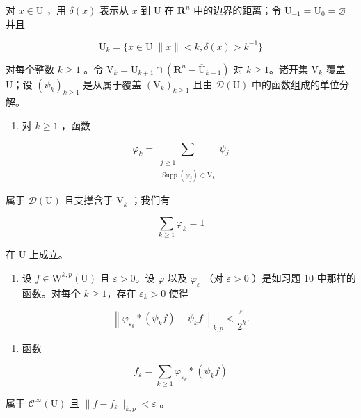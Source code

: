 对 \(x \in \mathrm{U}\) ，用 \(\delta(x)\) 表示从 \(x\) 到 \(\mathrm{U}\) 在 \(\mathbf{R}^n\) 中的边界的距离；令 \(\mathrm{U}_{-1} = \mathrm{U}_0 = \varnothing\) 并且

\[
\mathrm{U} _ {k} = \{x \in \mathrm{U} | \| x \| <   k, \delta (x) > k ^ {- 1} \}
\]

对每个整数 \(k \geqslant 1\) 。令 \(\mathrm{V}_k = \mathrm{U}_{k+1} \cap (\mathbf{R}^n - \overline{\mathrm{U}}_{k-1})\) 对 \(k \geqslant 1\)。诸开集 \(\mathrm{V}_k\) 覆盖 U；设 \((\psi_k)_{k \geqslant 1}\) 是从属于覆盖 \((\mathrm{V}_k)_{k \geqslant 1}\) 且由 \(\mathcal{D}(\mathrm{U})\) 中的函数组成的单位分解。

\begin{enumerate}
\def\labelenumi{\alph{enumi})}
\tightlist
\item
  对 \(k \geqslant 1\) ，函数
\end{enumerate}

\[
\varphi_{k} = \sum_{\substack{j\geqslant 1\\ \operatorname{Supp}(\psi_{j})\subset \mathrm{V}_{k}}}\psi_{j}
\]

属于 \(\mathcal{D}(\mathrm{U})\) 且支撑含于 \(\mathrm{V}_k\) ；我们有

\[
\sum_ {k \geqslant 1} \varphi_ {k} = 1
\]

在 U 上成立。

\begin{enumerate}
\def\labelenumi{\alph{enumi})}
\setcounter{enumi}{1}
\tightlist
\item
  设 \(f \in \mathrm{W}^{k,p}(\mathrm{U})\) 且 \(\varepsilon > 0\)。设 \(\varphi\) 以及 \(\varphi_{\varepsilon}\) （对 \(\varepsilon > 0\) ）是如习题 10 中那样的函数。对每个 \(k \geqslant 1\)，存在 \(\varepsilon_{k} > 0\) 使得
\end{enumerate}

\[
\left\| \varphi_ {\varepsilon_ {k}} * (\psi_ {k} f) - \psi_ {k} f \right\| _ {k, p} <   \frac {\varepsilon}{2 ^ {k}}.
\]

\begin{enumerate}
\def\labelenumi{\alph{enumi})}
\setcounter{enumi}{2}
\tightlist
\item
  函数
\end{enumerate}

\[
f _ {\varepsilon} = \sum_ {k \geqslant 1} \varphi_ {\varepsilon_ {k}} * (\psi_ {k} f)
\]

属于 \(\mathcal{C}^{\infty}(\mathrm{U})\) 且 \(\| f - f_{\varepsilon}\|_{k,p} < \varepsilon\) 。

